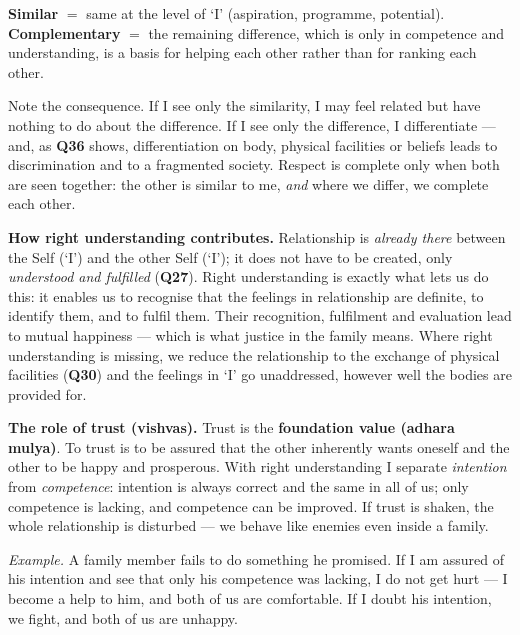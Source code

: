 \begin{keybox}
\textbf{Similar} $=$ same at the level of `I' (aspiration, programme,
potential). \quad \textbf{Complementary} $=$ the remaining difference, which
is only in competence and understanding, is a basis for helping each other
rather than for ranking each other.
\end{keybox}

Note the consequence. If I see only the similarity, I may feel related but
have nothing to do about the difference. If I see only the difference, I
differentiate --- and, as \textbf{Q36} shows, differentiation on body,
physical facilities or beliefs leads to discrimination and to a fragmented
society. Respect is complete only when both are seen together: the other is
similar to me, \emph{and} where we differ, we complete each other.


\ans \textbf{How right understanding contributes.} Relationship is
\emph{already there} between the Self (`I') and the other Self (`I'); it does
not have to be created, only \emph{understood and fulfilled}
(\textbf{Q27}). Right understanding is exactly what lets us do this: it
enables us to recognise that the feelings in relationship are definite, to
identify them, and to fulfil them. Their recognition, fulfilment and
evaluation lead to mutual happiness --- which is what justice in the family
means. Where right understanding is missing, we reduce the relationship to the
exchange of physical facilities (\textbf{Q30}) and the feelings in `I' go
unaddressed, however well the bodies are provided for.

\textbf{The role of trust (vishvas).} Trust is the \textbf{foundation value
(adhara mulya)}. To trust is to be assured that the other inherently wants
oneself and the other to be happy and prosperous. With right understanding I
separate \emph{intention} from \emph{competence}: intention is always correct
and the same in all of us; only competence is lacking, and competence can be
improved. If trust is shaken, the whole relationship is disturbed --- we
behave like enemies even inside a family.

\emph{Example.} A family member fails to do something he promised. If I am
assured of his intention and see that only his competence was lacking, I do
not get hurt --- I become a help to him, and both of us are comfortable. If I
doubt his intention, we fight, and both of us are unhappy.

